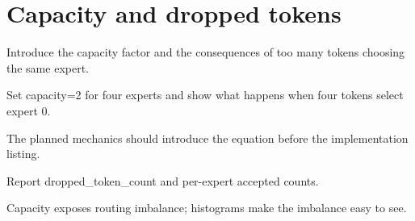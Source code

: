 \section{Capacity and dropped tokens}
\label{sec:ch04-capacity-and-dropped-tokens}

Introduce the capacity factor and the consequences of too many tokens choosing the same expert.



Set capacity=2 for four experts and show what happens when four tokens select expert 0.



The planned mechanics should introduce the equation before the implementation listing.





\begin{checkpointbox}
Report dropped\_token\_count and per-expert accepted counts.
\end{checkpointbox}

Capacity exposes routing imbalance; histograms make the imbalance easy to see.
